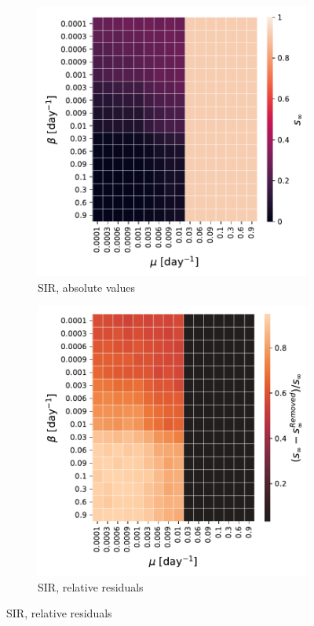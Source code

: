 \documentclass[a4paper,11pt, twocolumn]{article}
\begin{document}
\begin{figure}[H]
\begin{subfigure}[t]{0.24\textwidth}
\centering
\includegraphics[scale=0.30
]{./Figure/Simulations/SIR_temporal_53706_rm5.pdf}
\caption{SIR, absolute values}
\end{subfigure}
\begin{subfigure}[t]{0.24\textwidth}
 \centering
\includegraphics[scale=0.30]{./Figure/Simulations/SIR_temporal_53706_rm5_diff.pdf}
\caption{SIR, relative residuals}
\end{subfigure}


\end{figure}
\end{document}
